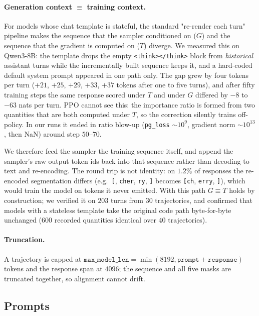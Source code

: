 \paragraph{Generation context $\equiv$ training context.}
For models whose chat template is stateful, the standard "re-render each turn" pipeline
makes the sequence that the sampler conditioned on ($G$) and the sequence that the
gradient is computed on ($T$) diverge. We measured this on Qwen3-8B: the template drops
the empty \verb|<think></think>| block from \emph{historical} assistant turns while the
incrementally built sequence keeps it, and a hard-coded default system prompt appeared in
one path only. The gap grew by four tokens per turn ($+21$, $+25$, $+29$, $+33$, $+37$
tokens after one to five turns), and after fifty training steps the same response scored
under $T$ and under $G$ differed by $-8$ to $-63$ nats per turn. PPO cannot see this: the
importance ratio is formed from two quantities that are both computed under $T$, so the
correction silently trains off-policy. In our runs it ended in ratio blow-up
(\texttt{pg\_loss} $\sim\!10^{9}$, gradient norm $\sim\!10^{13}$, then NaN) around step
$50$--$70$.

We therefore feed the sampler the training sequence itself, and append the sampler's raw
output token ids back into that sequence rather than decoding to text and re-encoding.
The round trip is not identity: on $1.2\%$ of responses the re-encoded segmentation
differs (e.g.\ \texttt{[}, \texttt{cher}, \texttt{ry}, \texttt{]} becomes \texttt{[ch},
\texttt{erry}, \texttt{]}), which would train the model on tokens it never emitted. With
this path $G \equiv T$ holds by construction; we verified it on $203$ turns from $30$
trajectories, and confirmed that models with a stateless template take the original code
path byte-for-byte unchanged ($600$ recorded quantities identical over $40$ trajectories).

\paragraph{Truncation.}
A trajectory is capped at $\texttt{max\_model\_len} = \min(8192, \texttt{prompt} +
\texttt{response})$ tokens and the response span at $4096$; the sequence and all five
masks are truncated together, so alignment cannot drift.

\subsection{Prompts}
\label{app:prompts}

